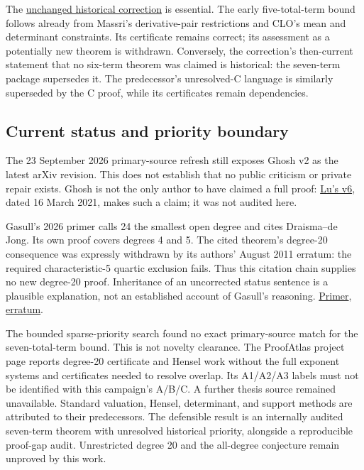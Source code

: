 \documentclass[
  british,
  10pt,
]{article}
\begin{document}
The \href{evidence/AUDIT_NOVELTY_CORRECTION.md}{unchanged historical
correction} is essential. The early five-total-term bound follows
already from Massri's derivative-pair restrictions and CLO's mean and
determinant constraints. Its certificate remains correct; its assessment
as a potentially new theorem is withdrawn. Conversely, the correction's
then-current statement that no six-term theorem was claimed is
historical: the seven-term package supersedes it. The predecessor's
unresolved-C language is similarly superseded by the C proof, while its
certificates remain dependencies.

\subsection{Current status and priority
boundary}\label{current-status-and-priority-boundary}

The 23 September 2026 primary-source refresh still exposes Ghosh v2 as
the latest arXiv revision. This does not establish that no public
criticism or private repair exists. Ghosh is not the only author to have
claimed a full proof: \href{https://arxiv.org/abs/1707.04754v6}{Lu's
v6}, dated 16 March 2021, makes such a claim; it was not audited here.

Gasull's 2026 primer calls 24 the smallest open degree and cites
Draisma--de Jong. Its own proof covers degrees 4 and 5. The cited
theorem's degree-20 consequence was expressly withdrawn by its authors'
August 2011 erratum: the required characteristic-5 quartic exclusion
fails. Thus this citation chain supplies no new degree-20 proof.
Inheritance of an uncorrected status sentence is a plausible
explanation, not an established account of Gasull's reasoning.
\href{https://link.springer.com/article/10.1007/s44425-026-00047-6}{Primer},
\href{https://math-unibe.ch/jdraisma/publications/erratumcasasalvero.pdf}{erratum}.

The bounded sparse-priority search found no exact primary-source match
for the seven-total-term bound. This is not novelty clearance. The
ProofAtlas project page reports degree-20 certificate and Hensel work
without the full exponent systems and certificates needed to resolve
overlap. Its A1/A2/A3 labels must not be identified with this campaign's
A/B/C. A further thesis source remained unavailable. Standard valuation,
Hensel, determinant, and support methods are attributed to their
predecessors. The defensible result is an internally audited seven-term
theorem with unresolved historical priority, alongside a reproducible
proof-gap audit. Unrestricted degree 20 and the all-degree conjecture
remain unproved by this work.
\end{document}

